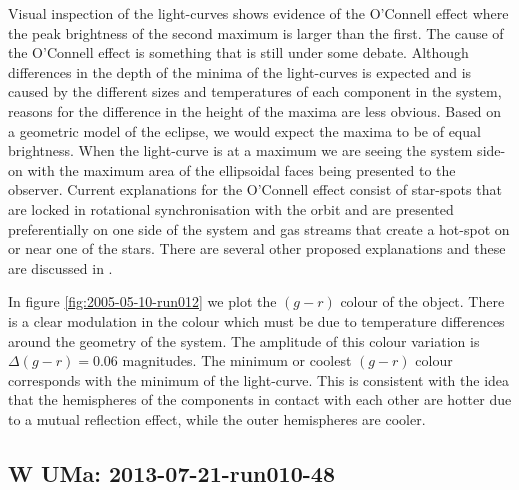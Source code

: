 Visual inspection of the light-curves shows evidence of the O'Connell effect where the peak brightness of the second maximum is larger than the first. The cause of the O'Connell effect is something that is still under some debate. Although differences in the depth of the minima of the light-curves is expected and is caused by the different sizes and temperatures of each component in the system, reasons for the difference in the height of the maxima are less obvious. Based on a geometric model of the eclipse, we would expect the maxima to be of equal brightness. When the light-curve is at a maximum we are seeing the system side-on with the maximum area of the ellipsoidal faces being presented to the observer. Current explanations for the O'Connell effect consist of star-spots that are locked in rotational synchronisation with the orbit and are presented preferentially on one side of the system and gas streams that create a hot-spot on or near one of the stars. There are several other proposed explanations and these are discussed in \citet{oconnelleffect}.  

In figure \ref{fig:2005-05-10-run012} we plot the $(g-r)$ colour of the object. There is a clear modulation in the colour which must be due to temperature differences around the geometry of the system. The amplitude of this colour variation is $\Delta(g-r) = 0.06$ magnitudes. The minimum or coolest $(g - r)$ colour corresponds with the minimum of the light-curve. This is consistent with the idea that the hemispheres of the components in contact with each other are hotter due to a mutual reflection effect, while the outer hemispheres are cooler. 

\subsection{{W UMa}: 2013-07-21-run010-48}


